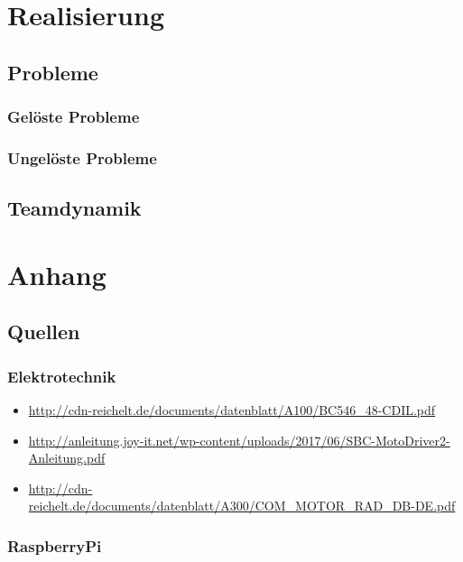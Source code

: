 \documentclass{report}
\begin{document}
\chapter{Realisierung}

\section{Probleme}

\subsection{Gelöste Probleme}

\subsection{Ungelöste Probleme}

\section{Teamdynamik}

\chapter{Anhang}
\section{Quellen}

\subsection{Elektrotechnik}
\begin{itemize}

\item \url{http://cdn-reichelt.de/documents/datenblatt/A100/BC546_48-CDIL.pdf}


\item \url{http://anleitung.joy-it.net/wp-content/uploads/2017/06/SBC-MotoDriver2-Anleitung.pdf}

\item \url{http://cdn-reichelt.de/documents/datenblatt/A300/COM_MOTOR_RAD_DB-DE.pdf}

\end{itemize}

\subsection{RaspberryPi}
\end{document}
